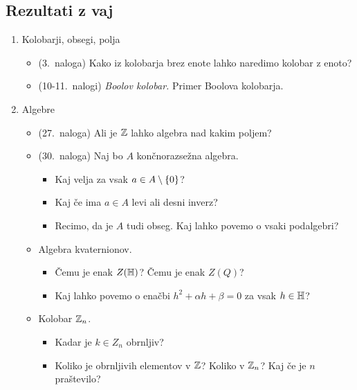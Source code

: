 \subsection*{Rezultati z vaj}
\begin{enumerate}
    \item Kolobarji, obsegi, polja
    \begin{itemize}
        \item (3.\ naloga) Kako iz kolobarja brez enote lahko naredimo kolobar z enoto?
        \item (10-11.\ nalogi) \emph{Boolov kolobar.} Primer Boolova kolobarja.
    \end{itemize}

    \item Algebre
    \begin{itemize}
        \item (27.\ naloga) Ali je $\mathbb{Z}$ lahko algebra nad kakim poljem?
        \item (30.\ naloga) Naj bo $A$ končnorazsežna algebra.    
        \begin{itemize}
            \item Kaj velja za vsak $a \in A \setminus \{0\}$?
            \item Kaj če ima $a \in A$ levi ali desni inverz?
            \item Recimo, da je $A$ tudi obseg. Kaj lahko povemo o vsaki podalgebri?
        \end{itemize}
        \item Algebra kvaternionov.
        \begin{itemize}
            \item Čemu je enak $Z(\mathbb{H})$? Čemu je enak $Z(Q)$?
            \item Kaj lahko povemo o enačbi $h^2 + \alpha h + \beta = 0$ za vsak $h \in \mathbb{H}$?
        \end{itemize}

        \item Kolobar $\mathbb{Z}_n$.
        \begin{itemize}
            \item Kadar je $k \in Z_n$ obrnljiv?
            \item Koliko je obrnljivih elementov v $\mathbb{Z}$? Koliko v $\mathbb{Z}_n$? Kaj če je $n$ praštevilo?
        \end{itemize}
    \end{itemize}
\end{enumerate}